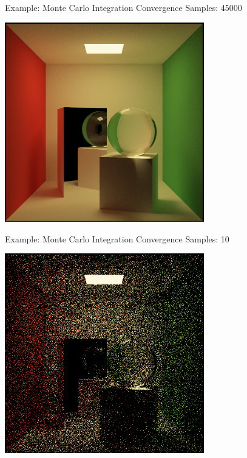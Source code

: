 \documentclass{beamer}
\begin{document}
\begin{frame}{Example: Monte Carlo Integration Convergence}
    Samples: 45000
    \begin{center}
        \includegraphics[width=0.65\textwidth]{../img/convergence/cornell-45000.png}
    \end{center}
\end{frame}

\begin{frame}{Example: Monte Carlo Integration Convergence}
    Samples: 10
    \begin{center}
        \includegraphics[width=0.65\textwidth]{../img/convergence/cornell-00010.png}
    \end{center}
\end{frame}
\end{document}

